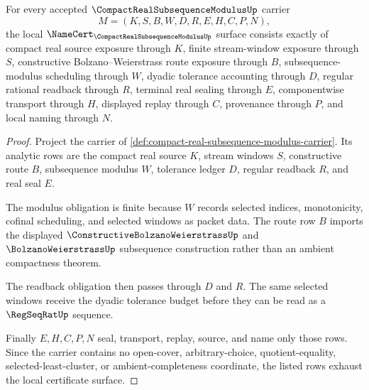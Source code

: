 \begin{theorem}
\label{thm:compact-real-subsequence-modulus-namecert-obligations}
For every accepted $\CompactRealSubsequenceModulusUp$ carrier
$$
M=(K,S,B,W,D,R,E,H,C,P,N),
$$
the local $\NameCert_{\CompactRealSubsequenceModulusUp}$ surface consists exactly of compact real source exposure through $K$, finite stream-window exposure through $S$, constructive Bolzano--Weierstrass route exposure through $B$, subsequence-modulus scheduling through $W$, dyadic tolerance accounting through $D$, regular rational readback through $R$, terminal real sealing through $E$, componentwise transport through $H$, displayed replay through $C$, provenance through $P$, and local naming through $N$.
\end{theorem}
\begin{proof}
Project the carrier of \autoref{def:compact-real-subsequence-modulus-carrier}. Its analytic rows are the compact real source $K$, stream windows $S$, constructive route $B$, subsequence modulus $W$, tolerance ledger $D$, regular readback $R$, and real seal $E$.

The modulus obligation is finite because $W$ records selected indices, monotonicity, cofinal scheduling, and selected windows as packet data. The route row $B$ imports the displayed $\ConstructiveBolzanoWeierstrassUp$ and $\BolzanoWeierstrassUp$ subsequence construction rather than an ambient compactness theorem.

The readback obligation then passes through $D$ and $R$. The same selected windows receive the dyadic tolerance budget before they can be read as a $\RegSeqRatUp$ sequence.

Finally $E,H,C,P,N$ seal, transport, replay, source, and name only those rows. Since the carrier contains no open-cover, arbitrary-choice, quotient-equality, selected-least-cluster, or ambient-completeness coordinate, the listed rows exhaust the local certificate surface.
\end{proof}

